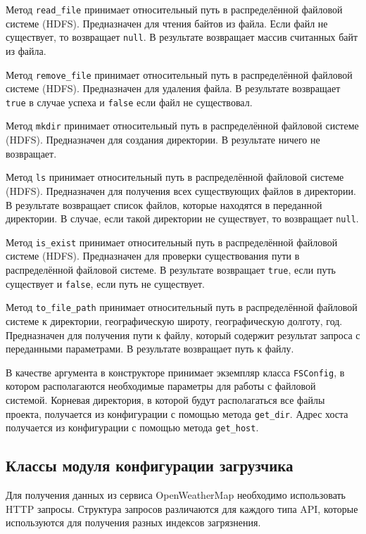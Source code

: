Метод \texttt{read\_file} принимает относительный путь в распределённой файловой системе (HDFS).
Предназначен для чтения байтов из файла.
Если файл не существует, то возвращает \texttt{null}.
В результате возвращает массив считанных байт из файла.

Метод \texttt{remove\_file} принимает относительный путь в распределённой файловой системе (HDFS).
Предназначен для удаления файла.
В результате возвращает \texttt{true} в случае успеха и \texttt{false} если файл не существовал.

Метод \texttt{mkdir} принимает относительный путь в распределённой файловой системе (HDFS).
Предназначен для создания директории. 
В результате ничего не возвращает.

Метод \texttt{ls} принимает относительный путь в распределённой файловой системе (HDFS).
Предназначен для получения всех существующих файлов в директории.
В результате возвращает список файлов, которые находятся в переданной директории.
В случае, если такой директории не существует, то возвращает \texttt{null}.

Метод \texttt{is\_exist} принимает относительный путь в распределённой файловой системе (HDFS).
Предназначен для проверки существования пути в распределённой файловой системе.
В результате возвращает \texttt{true}, если путь существует и \texttt{false}, если путь не существует.

Метод \texttt{to\_file\_path} принимает относительный путь в распределённой файловой системе к директории, географическую широту, географическую долготу, год.
Предназначен для получения пути к файлу, который содержит результат запроса с переданными параметрами.
В результате возвращает путь к файлу.


В качестве аргумента в конструкторе принимает экземпляр класса \texttt{FSConfig}, в котором располагаются необходимые параметры для работы с файловой системой.
Корневая директория, в которой будут располагаться все файлы проекта, получается из конфигурации с помощью метода \texttt{get\_dir}.
Адрес хоста получается из конфигурации с помощью метода \texttt{get\_host}.

\subsection{Классы модуля конфигурации загрузчика}
Для получения данных из сервиса OpenWeatherMap необходимо использовать HTTP запросы.
Структура запросов различаются для каждого типа API, которые используются для получения разных индексов загрязнения.


